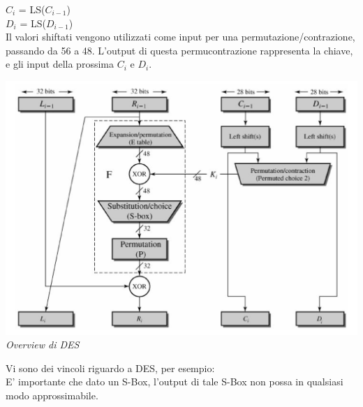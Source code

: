 \documentclass[11pt, oneside]{article}   	%
\begin{document}
$C_i$ = LS($C_{i-1}$)\\
$D_i$ = LS($D_{i-1}$)\\
Il valori shiftati vengono utilizzati come input per una permutazione/contrazione, passando da 56 a 48. L'output di questa permucontrazione rappresenta la chiave, e gli input della prossima $C_i$  e $D_i$.\\
\begin{center}
\includegraphics[scale= 0.5]{des3}\\
\emph{Overview di DES}
\end{center}
Vi sono dei vincoli riguardo a DES, per esempio:\\
E' importante che dato un S-Box, l'output di tale S-Box non possa in qualsiasi modo approssimabile.
\end{document}
